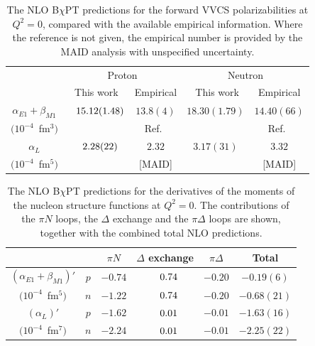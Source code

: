 \documentclass[11pt,preprint,tightenlines,
showpacs,preprintnumbers,amsmath,amssymb,superscriptaddress,a4paper,nofootinbib]{revtex4-1}
\def\hpm{\hphantom{-}}
\begin{document}
\begin{table}[h]
\caption{The NLO B$\chi$PT predictions for the forward VVCS polarizabilities at $Q^2=0$,
compared with the available empirical information. Where the reference is
not given, the empirical number is provided by the MAID analysis \cite{Drechsel:2000ct,MAID} with unspecified uncertainty.
\label{Table:Results-Pol}}
\begin{tabular}{c|c|c||c|c|}
\cline{2-5} 
&  \multicolumn{2}{|c||}{ Proton} & 
\multicolumn{2}{|c|}{Neutron} \\
\cline{2-5} 
  & \, This work \, & Empirical   & \, This work\, & \,\,Empirical\,\, \\
\hline
\multicolumn{1}{|c|}{$\alpha_{E1}+\beta_{M1}$} &$\hpm15.12(1.48)$ & $13.8(4)$ &$18.30(1.79)$  &$14.40(66)$\\
\multicolumn{1}{|c|}{$(10^{-4}$~fm$^3)$} & & Ref.~\cite{Olm01}& &Ref.~\cite{Babusci:1997ij}\\
\hline
\multicolumn{1}{|c|}{$\alpha_L$} &$\hpm2.28(22)$ & $2.32$ & $3.17(31)$  & $3.32$\\
\multicolumn{1}{|c|}{$(10^{-4}$~fm$^5)$} &&[MAID]&&[MAID]\\
\hline
\end{tabular}
\end{table}

\begin{table}[h]
\caption{The NLO B$\chi$PT predictions for the derivatives of the moments of the nucleon structure functions at $Q^2=0$. The contributions of the $\pi N$ loops, the $\Delta$ exchange and the $\pi\Delta$ loops are shown, together with the combined total NLO predictions. 
\label{Table:Results-DerPol}}
\begin{tabular}{cc|c|c|c|c|}
\cline{3-6} 
&& $\pi N$ & $\Delta$ exchange   & $\pi\Delta$ &  Total \\
\hline
\multicolumn{1}{|c||}{$(\alpha_{E1}+\beta_{M1})'$} &$p$&$-0.74$&$\hpm0.74$&$-0.20$&$-0.19(6)$\\
\multicolumn{1}{|c||}{$(10^{-4}$~fm$^5)$} &$n$&$-1.22$&$\hpm0.74$&$-0.20$&$-0.68(21)$\\
\hline
\multicolumn{1}{|c||}{$(\alpha_L)'$}&$p$ &$-1.62$&$\hpm0.01$&$-0.01$&$-1.63(16)$\\
\multicolumn{1}{|c||}{$(10^{-4}$~fm$^7)$} &$n$&$-2.24$&$\hpm0.01$&$-0.01$&$-2.25(22)$\\
\hline
\end{tabular}
\end{table}
\end{document}
